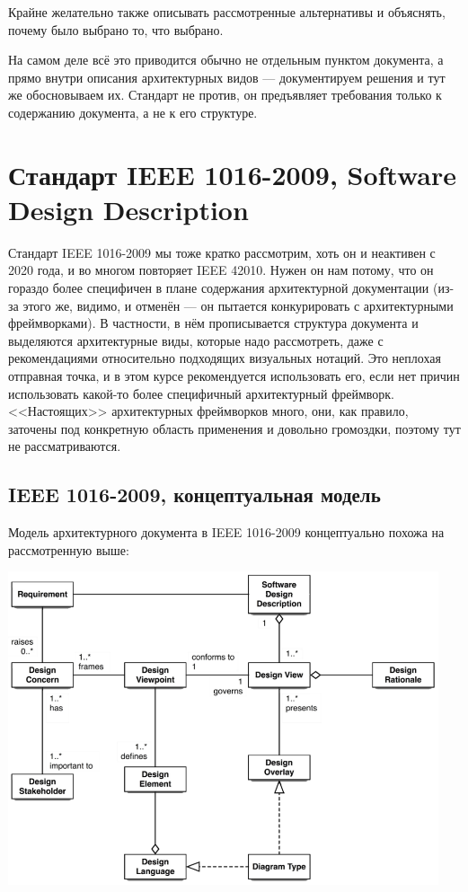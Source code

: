 \documentclass{../mcstext}
\begin{document}
\begin{itemize}
    Крайне желательно также описывать рассмотренные альтернативы и объяснять, почему было выбрано то, что выбрано.
    
    На самом деле всё это приводится обычно не отдельным пунктом документа, а прямо внутри описания архитектурных видов --- документируем решения и тут же обосновываем их. Стандарт не против, он предъявляет требования только к содержанию документа, а не к его структуре.
\end{itemize}

\section{Стандарт IEEE 1016-2009, Software Design Description}

Стандарт IEEE 1016-2009 мы тоже кратко рассмотрим, хоть он и неактивен с 2020 года, и во многом повторяет IEEE 42010. Нужен он нам потому, что он гораздо более специфичен в плане содержания архитектурной документации (из-за этого же, видимо, и отменён --- он пытается конкурировать с архитектурными фреймворками). В частности, в нём прописывается структура документа и выделяются архитектурные виды, которые надо рассмотреть, даже с рекомендациями относительно подходящих визуальных нотаций. Это неплохая отправная точка, и в этом курсе рекомендуется использовать его, если нет причин использовать какой-то более специфичный архитектурный фреймворк. <<Настоящих>> архитектурных фреймворков много, они, как правило, заточены под конкретную область применения и довольно громоздки, поэтому тут не рассматриваются.

\subsection{IEEE 1016-2009, концептуальная модель}

Модель архитектурного документа в IEEE 1016-2009 концептуально похожа на рассмотренную выше:

\begin{center}
    \includegraphics[width=0.95\textwidth]{ieee1016Concepts.png}
\end{center}
\end{document}
